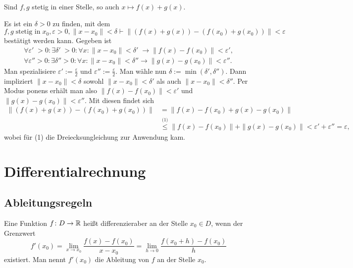 \begin{Satz}
Sind $f,g$ stetig in einer Stelle, so auch $x\mapsto f(x)+g(x)$.
\end{Satz}
\begin{Beweis}
Es ist ein $\delta>0$ zu finden, mit dem
\[f,g\;\text{stetig in}\;x_0,\varepsilon>0,\|x-x_0\|<\delta\vdash
\|(f(x)+g(x))-(f(x_0)+g(x_0))\|<\varepsilon\]
bestätigt werden kann. Gegeben ist
\begin{gather*}
\forall\varepsilon'\;>0\colon\exists\delta'\;>0\colon\forall x\colon \|x-x_0\|<\delta'\;\to \|f(x)-f(x_0)\|<\varepsilon',\\
\forall\varepsilon''>0\colon\exists\delta''>0\colon\forall x\colon \|x-x_0\|<\delta''\to \|g(x)-g(x_0)\|<\varepsilon''.
\end{gather*}
Man spezialisiere $\varepsilon':=\frac{\varepsilon}{2}$ und
$\varepsilon'':=\frac{\varepsilon}{2}$. Man wähle nun
$\delta:=\min(\delta',\delta'')$. Dann impliziert $\|x-x_0\|<\delta$
sowohl $\|x-x_0\|<\delta'$ als auch $\|x-x_0\|<\delta''$. Per Modus ponens
erhält man also $\|f(x)-f(x_0)\|<\varepsilon'$ und $\|g(x)-g(x_0)\|<\varepsilon''$.
Mit diesen findet sich
\begin{align*}
\|(f(x)+g(x))-(f(x_0)+g(x_0))\| &= \|f(x)-f(x_0)+g(x)-g(x_0)\|\\
&\stackrel{\text{(1)}}\le \|f(x)-f(x_0)\|+\|g(x)-g(x_0)\| < \varepsilon'+\varepsilon'' = \varepsilon,
\end{align*}
wobei für (1) die Dreiecksungleichung zur Anwendung kam.\,\qedsymbol
\end{Beweis}

\newpage
\section{Differentialrechnung}

\subsection{Ableitungsregeln}

\begin{Definition}%
\label{diff}
Eine Funktion $f\colon D\to\mathbb R$ heißt differenzieraber an der Stelle
$x_0\in D$, wenn der Grenzwert%
\[f'(x_0) = \lim_{x\to x_0}\frac{f(x)-f(x_0)}{x-x_0}
= \lim_{h\to 0}\frac{f(x_0+h)-f(x_0)}{h}\]
existiert. Man nennt $f'(x_0)$ die Ableitung von $f$ an der Stelle
$x_0$.
\end{Definition}

